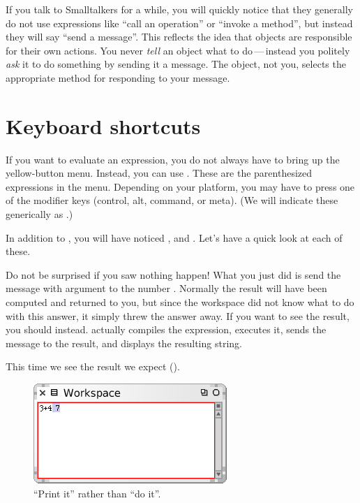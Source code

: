 \documentclass[a4paper,10pt,twoside]{book}
\begin{document}
If you talk to Smalltalkers for a while, you will quickly notice that they generally do not use expressions like ``call an operation'' or ``invoke a method'', but instead they will say ``send a message''.
This reflects the idea that objects are responsible for their own actions. 
You never \emph{tell} an object what to do\,---\,instead you politely \emph{ask} it to do something by sending it a message. 
The object, not you, selects the appropriate method for responding to your message.


\section{Keyboard shortcuts}

If you want  to evaluate an expression, you do not always have to bring up the yellow-button menu. Instead, you can use . These are the parenthesized expressions in the menu.  Depending on your platform, you may have to press one of the modifier keys (control, alt, command, or meta).
(We will indicate these generically as .)


In addition to , you will have noticed ,  and . Let's have a quick look at each of these.


Do not be surprised if you saw nothing happen! What you just did is send the message \ct{+} with argument  to the number . Normally the result  will have been computed and returned to you, but since the workspace did not know what to do with this answer, it simply threw the answer away.  If you want to see the result, you should  instead.  actually compiles the expression, executes it, sends the message  to the result, and displays the resulting string.

This time we see the result we expect ().

\begin{figure}[htb]
\centerline {\includegraphics[scale=0.7]{PrintIt}}
\caption{``Print it'' rather than ``do it''. \label{fig:printit}}
\end{figure}
\end{document}
